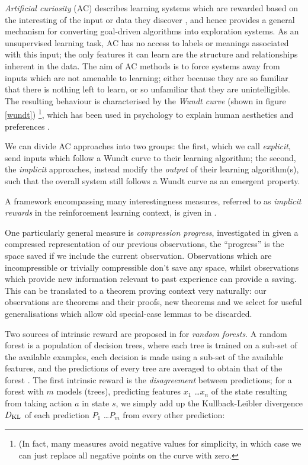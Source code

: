 \documentclass[]{article}
\begin{document}
\emph{Artificial curiosity} (AC) describes learning systems which are rewarded based on the interesting of the input or data they discover \cite{schmidhuber2006developmental}, and hence provides a general mechanism for converting goal-driven algorithms into exploration systems. As an unsupervised learning task, AC has no access to labels or meanings associated with this input; the only features it can learn are the structure and relationships inherent in the data. The aim of AC methods is to force systems away from inputs which are not amenable to learning; either because they are so familiar that there is nothing left to learn, or so unfamiliar that they are unintelligible. The resulting behaviour is characterised by the \emph{Wundt curve} (shown in figure \ref{wundt}) \footnote{(In fact, many measures avoid negative values for simplicity, in which case we can just replace all negative points on the curve with zero.}, which has been used in psychology to explain human aesthetics and preferences \cite{berlyne1970novelty}.

We can divide AC approaches into two groups: the first, which we call \emph{explicit}, send inputs which follow a Wundt curve to their learning algorithm; the second, the \emph{implicit} approaches, instead modify the \emph{output} of their learning algorithm(s), such that the overall system still follows a Wundt curve as an emergent property.

A framework encompassing many interestingness measures, referred to as \emph{implicit rewards} in the reinforcement learning context, is given in \cite{oudeyer2007intrinsic}.

One particularly general measure is \emph{compression progress}, investigated in  given a compressed representation of our previous observations, the ``progress'' is the space saved if we include the current observation. Observations which are incompressible or trivially compressible don't save any space, whilst observations which provide new information relevant to past experience can provide a saving. This can be translated to a theorem proving context very naturally: our observations are theorems and their proofs, new theorems and we select for useful generalisations which allow old special-case lemmas to be discarded.


Two sources of intrinsic reward are proposed in \cite{Hester.Stone:2012} for \emph{random forests}. A random forest is a population of decision trees, where each tree is trained on a sub-set of the available examples, each decision is made using a sub-set of the available features, and the predictions of every tree are averaged to obtain that of the forest \cite{randomforests}. The first intrinsic reward is the \emph{disagreement} between predictions; for a forest with $m$ models (trees), predicting features $x_1$ \dots $x_n$ of the state resulting from taking action $a$ in state $s$, we simply add up the Kullback-Leibler divergence $D_{\rm KL}$ of each prediction $P_1$ \dots $P_m$ from every other prediction:
\end{document}
